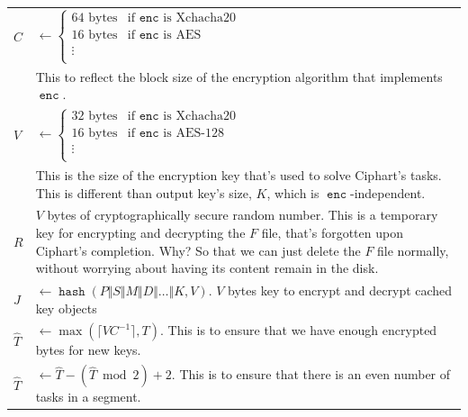 \documentclass[twocolumn]{article}
\DeclareMathOperator{\enc}{\mathtt{enc}}
\DeclareMathOperator{\maxf}{max}
\DeclareMathOperator{\hash}{\mathtt{hash}}
\begin{document}
\begin{tabularx}{\columnwidth}{lX}
    $C$         & $\gets \begin{cases}
                        64 \text{ bytes} & \text{if $\enc$ is
                                            Xchacha20}\\
                        16 \text{ bytes} & \text{if $\enc$ is AES}\\
                        \vdots & \\
                     \end{cases}$\\
                & This to reflect the block size of the encryption
                    algorithm that implements $\enc$.\\
    $V$ & $\gets \begin{cases}
                        32 \text{ bytes} & \text{if $\enc$ is
                                            Xchacha20}\\
                        16 \text{ bytes} & \text{if $\enc$ is
                            AES-128}\\
                        \vdots & \\
                     \end{cases}$\\
                & This is the size of the encryption key that's used to
                    solve Ciphart's tasks.  This is different than
                    output key's size, $K$, which is $\enc$-independent.\\
    $R$         & $V$ bytes of cryptographically secure random number.
                    This is a temporary key for encrypting and decrypting
                    the $F$ file, that's forgotten upon Ciphart's
                    completion.  Why?  So that we can just delete the $F$
                    file normally, without worrying about having its
                    content remain in the disk.\\
    $J$         & $\gets \hash(P \Vert S \Vert M \Vert D \Vert \ldots
                    \Vert K, V)$.  $V$ bytes key to encrypt and decrypt
                    cached key objects\\
    $\hat T$    & $\gets \maxf(\lceil V C^{-1}\rceil, T)$.  This
                    is to ensure that we have enough encrypted bytes for
                    new keys.\\
    $\hat T$    & $\gets \hat T - (\hat T \bmod 2) + 2$.  This is to ensure
                    that there is an even number of tasks in a segment.

\end{tabularx}
\end{document}
